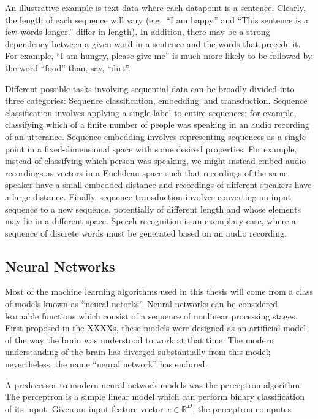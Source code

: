 An illustrative example is text data where each datapoint is a sentence.
Clearly, the length of each sequence will vary (e.g.\ ``I am happy.'' and ``This sentence is a few words longer.'' differ in length).
In addition, there may be a strong dependency between a given word in a sentence and the words that precede it.
For example, ``I am hungry, please give me'' is much more likely to be followed by the word ``food'' than, say, ``dirt''.

Different possible tasks involving sequential data can be broadly divided into three categories: Sequence classification, embedding, and transduction.
Sequence classification involves applying a single label to entire sequences; for example, classifying which of a finite number of people was speaking in an audio recording of an utterance.
Sequence embedding involves representing sequences as a single point in a fixed-dimensional space with some desired properties.
For example, instead of classifying which person was speaking, we might instead embed audio recordings as vectors in a Euclidean space such that recordings of the same speaker have a small embedded distance and recordings of different speakers have a large distance.
Finally, sequence transduction involves converting an input sequence to a new sequence, potentially of different length and whose elements may lie in a different space.
Speech recognition is an exemplary case, where a sequence of discrete words must be generated based on an audio recording.

\subsection{Neural Networks}

Most of the machine learning algorithms used in this thesis will come from a class of models known as ``neural netorks''.
Neural networks can be considered learnable functions which consist of a sequence of nonlinear processing stages.
First proposed in the XXXXs, these models were designed as an artificial model of the way the brain was understood to work at that time.
The modern understanding of the brain has diverged substantially from this model; nevertheless, the name ``neural network'' has endured.

A predecessor to modern neural network models was the perceptron algorithm.
The perceptron is a simple linear model which can perform binary classification of its input.
Given an input feature vector $x \in \mathbb{R}^D$, the perceptron computes


